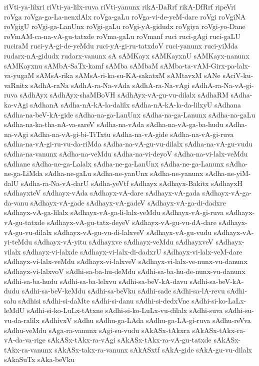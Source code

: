 {riVti-ya-lilxri
riVti-ya-lilx-ruva
riVti-yanunx
rikA-DaRrf
rikA-DfRrf
ripeVri
roVga
roVga-ga-La-nenxlAlx
roVga-gaLu
roVga-vi-de-yeM-dare
roVgi
roVgiNA
roVgigU
roVgi-ga-LanUnx
roVgi-gaLu
roVgi-yA-gidudx
roVgiya
roVgi-yo-Dane
roVmAM-ca-na-vA-gu-tatxde
roVma-gaLu
roVmanf
ruci
ruci-gAgi
ruci-gaLU
ruciraM
ruci-yA-gi-de-yeMdu
ruci-yA-gi-ru-tatxdoV
ruci-yanunx
ruci-yiMda
rudarx-nA-gidudx
rudarx-vanunx
sA
sAMKayx
sAMKayxnU
sAMKayx-nanunx
sAMKayxnu
sAMbA-SaTx-kamf
sAMba
sAMbaM
sAMba-ta-vAM-Girx-pa-lalx-va-yugaM
sAMsA-rika
sAMsA-ri-ka-su-KA-sakatxM
sAMtavxM
sANe
sAciV-ku-vaRnitx
sAdhA-raNa
sAdhA-ra-Na-vAda
sAdhA-ra-Na-vAgi
sAdhA-ra-Na-vA-gi-ruva
sAdhAyx
sAdhAyx-shaMBoVH
sAdhAyx-vA-gu-vu-dilalx
sAdhaRM
sAdha-ka-vAgi
sAdhanA
sAdha-nA-kA-la-dalilx
sAdha-nA-kA-la-da-lilxyU
sAdhana
sAdha-na-beV-kA-gide
sAdha-na-ga-LanUnx
sAdha-na-ga-Lanunx
sAdha-na-gaLu
sAdha-na-ka-tha-nA-va-sareV
sAdha-na-vAda
sAdha-na-vA-ga-ba-hudu
sAdha-na-vAgi
sAdha-na-vA-gi-bi-TiTxtu
sAdha-na-vA-gide
sAdha-na-vA-gi-ruva
sAdha-na-vA-gi-ru-vu-da-riMda
sAdha-na-vA-gu-vu-dilalx
sAdha-na-vA-gu-vudu
sAdha-na-vanunx
sAdha-na-veMdu
sAdha-na-vi-deyoV
sAdha-na-vi-lalx-veMdu
sAdhane
sAdha-ne-ga-Lalalx
sAdha-ne-ga-LanUnx
sAdha-ne-ga-Lanunx
sAdha-ne-ga-LiMda
sAdha-ne-gaLu
sAdha-ne-yanUnx
sAdha-ne-yanunx
sAdha-ne-yiM-dalU
sAdha-ra-Na-vA-darU
sAdha-yeVtf
sAdhayx
sAdhayx-Bakitx
sAdhayxH
sAdhayxteV
sAdhayx-vAda
sAdhayx-vA-dare
sAdhayx-vA-gada
sAdhayx-vA-ga-da-vanu
sAdhayx-vA-gade
sAdhayx-vA-gadeV
sAdhayx-vA-ga-di-dadxre
sAdhayx-vA-ga-lilalx
sAdhayx-vA-ga-li-lalx-veMdu
sAdhayx-vA-gi-ruva
sAdhayx-vA-gu-tatxde
sAdhayx-vA-gu-tatx-deyeV
sAdhayx-vA-gu-vu-dA-dare
sAdhayx-vA-gu-vu-dilalx
sAdhayx-vA-gu-vu-di-lalxveV
sAdhayx-vA-gu-vudu
sAdhayx-vA-yi-teMdu
sAdhayx-vA-yitu
sAdhayxve
sAdhayx-veMdu
sAdhayxveV
sAdhayx-vilalx
sAdhayx-vi-lalxde
sAdhayx-vi-lalx-di-dadxrU
sAdhayx-vi-lalx-veM-dare
sAdhayx-vi-lalx-veMdu
sAdhayx-vi-lalxveV
sAdhayx-vi-lalx-ve-nunx-vu-danunx
sAdhayx-vi-lalxvoV
sAdhi-sa-ba-hu-deMdu
sAdhi-sa-ba-hu-de-nunx-vu-danunx
sAdhi-sa-ba-hudu
sAdhi-sa-ba-lelxvu
sAdhi-sa-beV-kA-davu
sAdhi-sa-beV-kA-dudu
sAdhi-sa-beV-keMdu
sAdhi-sa-beVku
sAdhi-sade
sAdhi-sa-lA-revu
sAdhi-salu
sAdhisi
sAdhi-si-daMte
sAdhi-si-danu
sAdhi-si-dedxVne
sAdhi-si-ko-LaLx-leMdU
sAdhi-si-ko-LuLx-tAtxne
sAdhi-si-ko-LuLx-vu-dilalx
sAdhi-suva
sAdhi-su-vu-da-ralilx
sAdhivxV
sAdhu
sAdhu-ga-LAda
sAdhu-ga-LA-gi-ruva
sAdhu-reVva
sAdhu-veMdu
sAga-ra-vanunx
sAgi-su-vudu
sAkASx-tAkxra
sAkASx-tAkx-ra-vA-da-va-rige
sAkASx-tAkx-ra-vAgi
sAkASx-tAkx-ra-vA-gu-tatxde
sAkASx-tAkx-ra-vanunx
sAkASx-takx-ra-vanunx
sAkASxtf
sAkA-gide
sAkA-gu-vu-dilalx
sAkaSuTx
sAka-beVku
}
